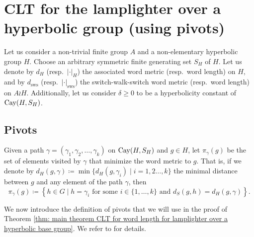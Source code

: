 \section{CLT for the lamplighter over a hyperbolic group (using pivots)}
Let us consider a non-trivial finite group $A$ and a non-elementary hyperbolic group $H$. Choose an arbitrary symmetric finite generating set $S_H$ of $H$. Let us denote by $d_H$ (resp.\ $|\cdot |_H$) the associated word metric (resp.\ word length) on $H$, and by $d_{\mathrm{sws}}$ (resp.\ $|\cdot|_{\mathrm{sws}}$) the switch-walk-switch word metric (resp.\ word length) on $A\wr H$. Additionally, let us consider $\delta\ge 0$ to be a hyperbolicity constant of $\mathrm{Cay}(H,S_H)$.

\subsection{Pivots}
\begin{defin}
	Given a path $\gamma=(\gamma_1,\gamma_2,\ldots,\gamma_k)$ on $\mathrm{Cay}(H,S_H)$ and $g\in H$, let $\pi_{\gamma}(g)$ be the set of elements visited by $\gamma$ that minimize the word metric to $g$. That is, if we denote by $d_H(g,\gamma)\coloneqq \min \{ d_H(g,\gamma_i)\mid i=1,2\ldots,k \}$ the minimal distance between $g$ and any element of the path $\gamma$, then
	\begin{equation}
		\pi_{\gamma}(g)\coloneqq \left\{ h\in G \mid  h=
		\gamma_i \text{ for some }i\in \{1,\ldots,k\}\text{ and }  d_S(g,h)= d_H(g,\gamma) \right \}.
	\end{equation}
\end{defin}

We now introduce the definition of pivots that we will use in the proof of Theorem \ref{thm: main theorem CLT for word length for lamplighter over a hyperbolic base group}. We refer to \cite[Section 4A]{Gouezel2022} for details.

